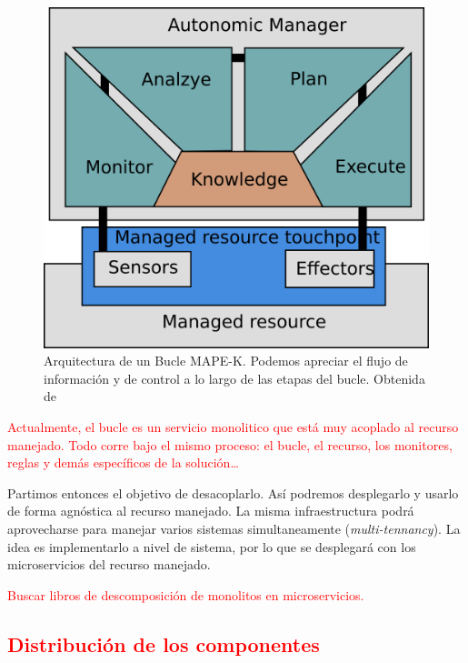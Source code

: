 \begin{figure}[htb]
  \centering
  \includegraphics[scale=1.15]{01_introduccion/images/bucle-mape-k}
  \caption[Arquitectura de un Bucle MAPE-K. Podemos apreciar el flujo de información y de control a lo largo de las etapas del bucle.]{Arquitectura de un Bucle MAPE-K. Podemos apreciar el flujo de información y de control a lo largo de las etapas del bucle. Obtenida de \cite{fonsEspecificacionSistemasAutoadaptativos2021}}
  \label{fig:bucle-mapek2}
\end{figure}

\textcolor{red}{Actualmente, el bucle es un servicio monolitico que está muy acoplado al recurso manejado. Todo corre bajo el mismo proceso: el bucle, el recurso, los monitores, reglas y demás específicos de la solución\dots  }

Partimos entonces el objetivo de desacoplarlo. Así podremos desplegarlo y usarlo de forma agnóstica al recurso manejado. La misma infraestructura podrá aprovecharse para manejar varios sistemas simultaneamente (\emph{multi-tennancy}). La idea es implementarlo a nivel de sistema\cite{mendoncaGeneralityVsReusability2018}, por lo que se desplegará con los microservicios del recurso manejado.

\textcolor{red}{Buscar libros de descomposición de monolitos en microservicios.}

\subsection{\textcolor{red}{Distribución de los componentes}}

